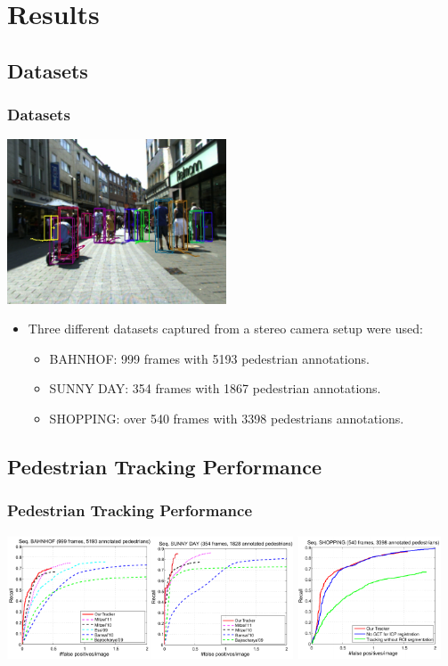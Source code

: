 \documentclass{beamer}
\begin{document}
\section{Results}
\subsection{Datasets}
\begin{frame}
\frametitle{Datasets}
\begin{center}
  	\includegraphics[width=6.5cm]{shopping_example.jpg}
\end{center}
\begin{itemize}
	\item Three different datasets captured from a stereo camera setup
 were used:
	\begin{itemize}
		\item BAHNHOF: 999 frames with 5193 pedestrian annotations.
		\item SUNNY DAY: 354 frames with 1867 pedestrian annotations.
		\item SHOPPING: over 540 frames with 3398 pedestrians annotations.
\end{itemize}
\end{itemize}
\end{frame}

\subsection{Pedestrian Tracking Performance}
\begin{frame}
\frametitle{Pedestrian Tracking Performance} 
\begin{center}
  	\includegraphics[width=8.5cm]{dataset_graphs.pdf} \newline
  	\includegraphics[width=4.25cm]{dataset_graphs_small.pdf}
\end{center}
\end{frame}
\end{document}
